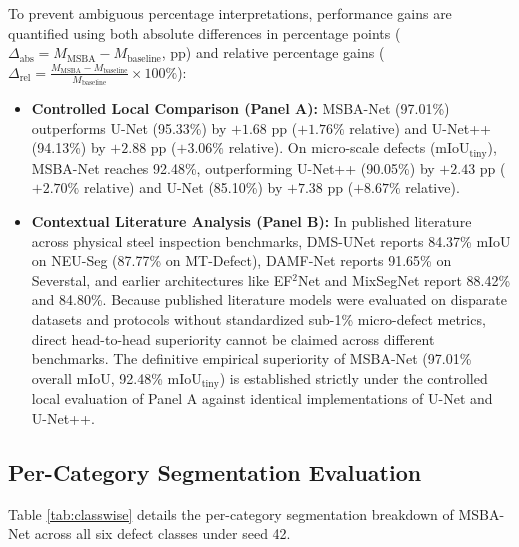 \documentclass{ieeeaccess}
\begin{document}
To prevent ambiguous percentage interpretations, performance gains are quantified using both absolute differences in percentage points ($\Delta_{\text{abs}} = M_{\text{MSBA}} - M_{\text{baseline}}$, pp) and relative percentage gains ($\Delta_{\text{rel}} = \frac{M_{\text{MSBA}} - M_{\text{baseline}}}{M_{\text{baseline}}} \times 100\%$):
\begin{itemize}
    \item \textbf{Controlled Local Comparison (Panel A):} MSBA-Net (97.01\%) outperforms U-Net (95.33\%) by $+1.68\text{ pp}$ ($+1.76\%$ relative) and U-Net++ (94.13\%) by $+2.88\text{ pp}$ ($+3.06\%$ relative). On micro-scale defects ($\text{mIoU}_{\text{tiny}}$), MSBA-Net reaches 92.48\%, outperforming U-Net++ (90.05\%) by $+2.43\text{ pp}$ ($+2.70\%$ relative) and U-Net (85.10\%) by $+7.38\text{ pp}$ ($+8.67\%$ relative).
    \item \textbf{Contextual Literature Analysis (Panel B):} In published literature across physical steel inspection benchmarks, DMS-UNet \cite{liu2026dmsunet} reports 84.37\% mIoU on NEU-Seg (87.77\% on MT-Defect), DAMF-Net \cite{liu2024damfnet} reports 91.65\% on Severstal, and earlier architectures like EF$^2$Net \cite{li2024ef2net} and MixSegNet \cite{zhou2024mixsegnet} report 88.42\% and 84.80\%. Because published literature models were evaluated on disparate datasets and protocols without standardized sub-1\% micro-defect metrics, direct head-to-head superiority cannot be claimed across different benchmarks. The definitive empirical superiority of MSBA-Net (97.01\% overall mIoU, 92.48\% $\text{mIoU}_{\text{tiny}}$) is established strictly under the controlled local evaluation of Panel A against identical implementations of U-Net and U-Net++.
\end{itemize}

\subsection{Per-Category Segmentation Evaluation}
Table \ref{tab:classwise} details the per-category segmentation breakdown of MSBA-Net across all six defect classes under seed 42.
\end{document}
